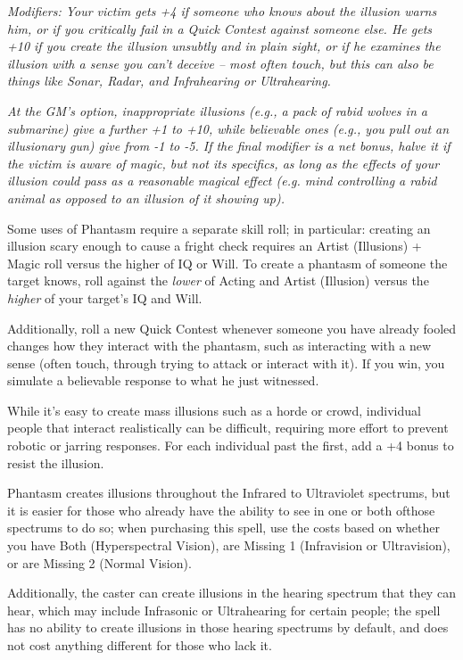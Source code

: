 \begin{multicols*}{3}
	\textcolor{NavyBlue}{\textit{Modifiers: Your victim gets +4 if someone who knows about the illusion warns him, or if you critically fail in a Quick Contest against someone else. He gets +10 if you create the illusion unsubtly and in plain sight, or if	he examines the illusion with a sense you can’t deceive – most often touch, but this can also be things like Sonar, Radar, and Infrahearing or Ultrahearing. }}
			
	\textcolor{NavyBlue}{\textit{At the GM’s option, inappropriate illusions (e.g., a pack of rabid wolves in a submarine) give a further +1 to +10, while believable ones (e.g., you pull out an illusionary gun) give from -1 to -5. If the final modifier is a net bonus, halve it if the victim is aware of magic, but not its specifics, as long as the effects of your illusion could pass as a reasonable magical effect (e.g. mind controlling a rabid animal as opposed to an illusion of it showing up).}}
	
	Some uses of Phantasm require a separate skill roll; in particular: creating an illusion scary enough to cause a fright check requires an Artist (Illusions) + Magic roll versus the higher of IQ or Will. To create a phantasm of someone the target knows, roll against the \textit{lower} of Acting and Artist (Illusion) versus the \textit{higher} of your target's IQ and Will.
	
	Additionally, roll a new Quick Contest whenever someone you have already fooled changes how they interact with the phantasm, such as interacting with a new sense (often touch, through trying to attack or interact with it). If you win, you simulate a believable response to what he just witnessed.
	
	While it's easy to create mass illusions such as a horde or crowd, individual people that interact realistically can be difficult, requiring more effort to prevent robotic or jarring responses. For each individual past the first, add a +4 bonus to resist the illusion.
	
	Phantasm creates illusions throughout the Infrared to Ultraviolet spectrums, but it is easier for those who already have the ability to see in one or both ofthose spectrums to do so; when purchasing this spell, use the costs based on whether you have Both (Hyperspectral Vision), are Missing 1 (Infravision or Ultravision), or are Missing 2 (Normal Vision). 
	
	Additionally, the caster can create illusions in the hearing spectrum that they can hear, which may include Infrasonic or Ultrahearing for certain people; the spell has no ability to create illusions in those hearing spectrums by default, and does not cost anything different for those who lack it.
	

\end{multicols*}
